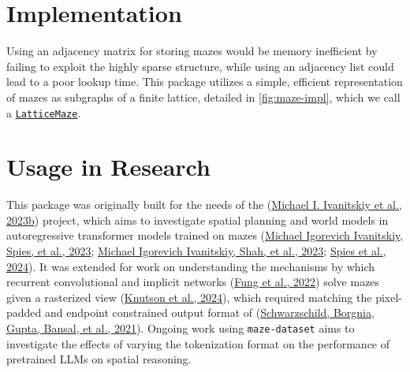 \documentclass[10pt,a4paper,onecolumn]{article}
\begin{document}






\hypertarget{sec:implementation}{%
\section{Implementation}\label{sec:implementation}}

Using an adjacency matrix for storing mazes would be memory inefficient
by failing to exploit the highly sparse structure, while using an
adjacency list could lead to a poor lookup time. This package utilizes a
simple, efficient representation of mazes as subgraphs of a finite
lattice, detailed in \autoref{fig:maze-impl}, which we call a
\href{https://understanding-search.github.io/maze-dataset/maze_dataset.html\#LatticeMaze}{\texttt{LatticeMaze}}.



\hypertarget{usage-in-research}{%
\section{Usage in Research}\label{usage-in-research}}

This package was originally built for the needs of the
(\protect\hyperlink{ref-maze-transformer-github}{Michael I. Ivanitskiy
et al., 2023b}) project, which aims to investigate spatial planning and
world models in autoregressive transformer models trained on mazes
(\protect\hyperlink{ref-ivanitskiy2023structuredworldreps}{Michael
Igorevich Ivanitskiy, Spies, et al., 2023};
\protect\hyperlink{ref-maze-dataset-arxiv-2023}{Michael Igorevich
Ivanitskiy, Shah, et al., 2023};
\protect\hyperlink{ref-spies2024causalworldmodels}{Spies et al., 2024}).
It was extended for work on understanding the mechanisms by which
recurrent convolutional and implicit networks
(\protect\hyperlink{ref-fung2022jfb}{Fung et al., 2022}) solve mazes
given a rasterized view
(\protect\hyperlink{ref-knutson2024logicalextrapolation}{Knutson et al.,
2024}), which required matching the pixel-padded and endpoint
constrained output format of
(\protect\hyperlink{ref-easy_to_hard}{Schwarzschild, Borgnia, Gupta,
Bansal, et al., 2021}). Ongoing work using \texttt{maze-dataset} aims to
investigate the effects of varying the tokenization format on the
performance of pretrained LLMs on spatial reasoning.
\end{document}
